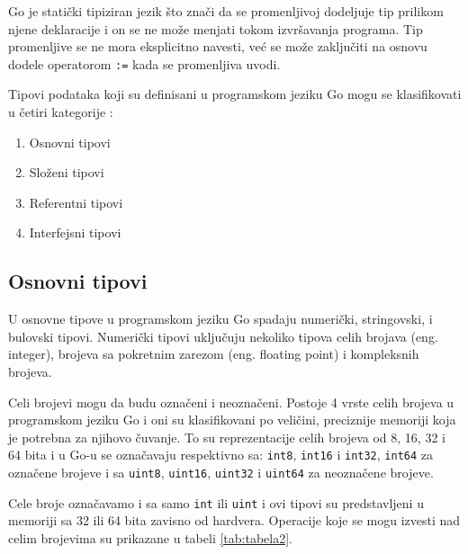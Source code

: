 \documentclass[a4paper]{article}
\begin{document}
Go je statički tipiziran jezik što znači da se promenljivoj dodeljuje tip prilikom njene deklaracije i on se ne može menjati tokom izvršavanja programa. Tip promenljive se ne mora eksplicitno navesti, već se može zaključiti na osnovu dodele operatorom \texttt{:=} kada se promenljiva uvodi.

Tipovi podataka koji su definisani u programskom jeziku Go mogu se klasifikovati u četiri kategorije \cite{TheGoProgramingLanguage}:

\begin{enumerate}
\item Osnovni tipovi 
\item Složeni tipovi
\item Referentni tipovi 
\item Interfejsni tipovi 
\end{enumerate}




\subsection{Osnovni tipovi}
\label{subsec:osnovni_tipovi}

U osnovne tipove u programskom jeziku Go spadaju numerički, stringovski, i bulovski tipovi. Numerički tipovi uključuju nekoliko tipova celih brojava (eng. integer), brojeva sa pokretnim zarezom (eng. floating point) i kompleksnih brojeva.

Celi brojevi mogu da budu označeni i neoznačeni. Postoje 4 vrste celih  brojeva u programskom jeziku Go i oni su klasifikovani po veličini, preciznije memoriji koja je potrebna za njihovo čuvanje. To su reprezentacije celih brojeva od 8, 16, 32 i 64 bita i u Go-u se označavaju respektivno sa: \texttt{int8}, \texttt{int16} i \texttt{int32}, \texttt{int64} za označene brojeve i sa \texttt{uint8}, \texttt{uint16}, \texttt{uint32} i \texttt{uint64}  za neoznačene brojeve. 

Cele broje označavamo i sa samo \texttt{int} ili \texttt{uint} i ovi tipovi su predstavljeni u memoriji sa 32 ili 64 bita zavisno od hardvera. Operacije koje se mogu izvesti nad celim brojevima su prikazane u tabeli \ref{tab:tabela2}.
\end{document}
